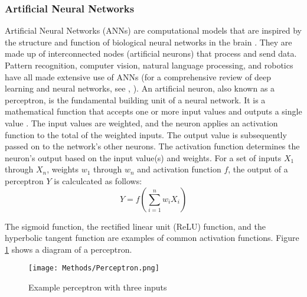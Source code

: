   \subsubsection{Artificial Neural Networks}
    Artificial Neural Networks (ANNs) are computational models that are inspired by the structure and function of biological neural networks in the brain \cite{NN_foundation}.
    They are made up of interconnected nodes (artificial neurons) that process and send data. 
    Pattern recognition, computer vision, natural language processing, and robotics have all made extensive use of ANNs 
    (for a comprehensive review of deep learning and neural networks, see \cite{Deep_learning_overview}, \cite{Goodfellow}).
    An artificial neuron, also known as a perceptron, is the fundamental building unit of a neural network. It is a mathematical function that accepts one or more input values 
    and outputs a single value \cite{Perceptron}.
    The input values are weighted, and the neuron applies an activation function to the total of the weighted inputs. The output value is subsequently passed on to the network's 
    other neurons. The activation function determines the neuron's output based on the input value(s) and weights.
    For a set of inputs $X_1$ through $X_n$, weights $w_1$ through $w_n$ and activation function $f$, the output of a perceptron $Y$ is calculcated as follows:
    \begin{equation}
      Y = f(\sum_{i=1}^n w_iX_i)
    \end{equation}

    The sigmoid function, the rectified linear unit (ReLU) function, and the hyperbolic tangent function are examples of common activation functions.
    Figure \ref{fig:Perceptron} shows a diagram of a perceptron.

    \begin{figure}[h]
      \begin{center}
        \texttt{[image: Methods/Perceptron.png]}
      \end{center}
      \caption{Example perceptron with three inputs}
      \label{fig:Perceptron}
    \end{figure}


